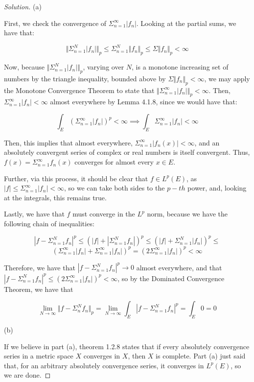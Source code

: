\documentclass[10pt]{article}
\begin{document}
\begin{proof}[Solution]

(a)

First, we check the convergence of $\Sigma_{n=1}^\infty |f_n|$. Looking at the partial sums, we have that:

$$\Vert \Sigma_{n=1}^N |f_n| \Vert_p \leq \Sigma_{n=1}^N \Vert f_n \Vert_p \leq \Sigma \Vert f_n \Vert_p < \infty$$

Now, because $\Vert \Sigma_{n=1}^N |f_n| \Vert_p$, varying over $N$, is a monotone increasing set of numbers by the triangle inequality, bounded above by $\Sigma \Vert f_n \Vert_p < \infty$, we may apply the Monotone Convergence Theorem to state that $\Vert \Sigma_{n=1}^\infty |f_n| \Vert_p < \infty$. Then, $ \Sigma_{n=1}^\infty |f_n| < \infty$ almost everywhere by Lemma 4.1.8, since we would have that:

$$ \int_E \left(  \Sigma_{n=1}^\infty |f_n| \right)^p < \infty \implies  \int_E \Sigma_{n=1}^\infty |f_n| < \infty $$

Then, this implies that almost everywhere, $\Sigma_{n=1}^\infty |f_n(x)| < \infty$, and an absolutely convergent series of complex or real numbers is itself convergent. Thus,  $f(x) = \Sigma_{n=1}^\infty f_n(x)$ converges for almost every $x \in E$.

Further, via this process, it should be clear that $f \in L^p(E)$, as $|f| \leq \Sigma_{n=1}^\infty |f_n| < \infty$, so we can take both sides to the $p-th$ power, and, looking at the integrals, this remains true.

Lastly, we have that $f$ must converge in the $L^p$ norm, because we have the following chain of inequalities:

$$ \left|f -  \Sigma_{n=1}^N f_n\right|^p  \leq \left(|f| + \left|\Sigma_{n=1}^N f_n\right|\right)^p \leq \left(|f| + \Sigma_{n=1}^N |f_n|\right)^p \leq $$
$$ \left( \Sigma_{n=1}^\infty |f_n| + \Sigma_{n=1}^\infty |f_n|\right)^p  = (2 \Sigma_{n=1}^\infty |f_n| )^p < \infty $$

Therefore, we have that $|f - \Sigma_{n=1}^N f_n|^p \to 0$ almost everywhere, and that $\left|f -  \Sigma_{n=1}^N f_n\right|^p \leq (2 \Sigma_{n=1}^\infty |f_n| )^p < \infty$, so by the Dominated Convergence Theorem, we have that 

$$ \lim_{N \to \infty} \Vert f - \Sigma_n^N f_n \Vert_p =  \lim_{N \to \infty} \int_E \left|f -  \Sigma_{n=1}^N f_n\right|^p = \int_E 0 = 0$$

(b)

If we believe in part (a), theorem 1.2.8 states that if every absolutely convergence series in a metric space $X$ converges in $X$, then $X$ is complete. Part (a) just said that, for an arbitrary absolutely convergence series, it converges in $L^p(E)$, so we are done.


\end{proof}
\end{document}
